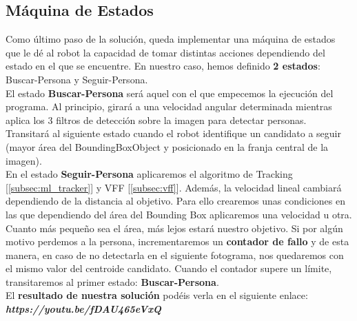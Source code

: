 \subsection{Máquina de Estados}
\label{subsec:maquina_estados}

Como último paso de la solución, queda implementar una máquina de estados que le dé al robot la capacidad de tomar distintas acciones dependiendo del estado en el que se encuentre. En nuestro caso, hemos definido \textbf{2 estados}: Buscar-Persona y Seguir-Persona.\\

El estado \textbf{Buscar-Persona} será aquel con el que empecemos la ejecución del programa. Al principio, girará a una velocidad angular determinada mientras aplica los 3 filtros de detección sobre la imagen para detectar personas. Transitará al siguiente estado cuando el robot identifique un candidato a seguir (mayor área del BoundingBoxObject y posicionado en la franja central de la imagen).\\

En el estado \textbf{Seguir-Persona} aplicaremos el algoritmo de Tracking [\ref{subsec:ml_tracker}] y VFF [\ref{subsec:vff}]. Además, la velocidad lineal cambiará dependiendo de la distancia al objetivo. Para ello crearemos unas condiciones en las que dependiendo del área del Bounding Box aplicaremos una velocidad u otra. Cuanto más pequeño sea el área, más lejos estará nuestro objetivo. Si por algún motivo perdemos a la persona, incrementaremos un \textbf{contador de fallo} y de esta manera, en caso de no detectarla en el siguiente fotograma, nos quedaremos con el mismo valor del centroide candidato. Cuando el contador supere un límite, transitaremos al primer estado: \textbf{Buscar-Persona}.\\

El \textbf{resultado de nuestra solución} podéis verla en el siguiente enlace: \textbf{\textit{https://youtu.be/fDAU465eVxQ}}


